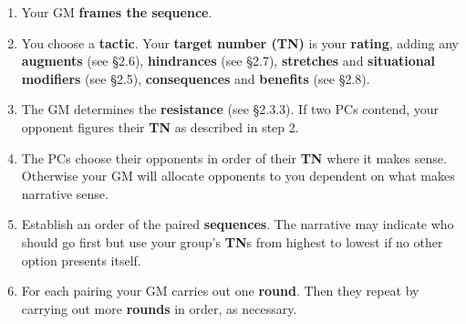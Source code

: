 \documentclass[
  11pt,
]{article}
\providecommand{\tightlist}{%
  \setlength{\itemsep}{0pt}\setlength{\parskip}{0pt}}
\begin{document}
\begin{enumerate}
\def\labelenumi{\arabic{enumi}.}
\tightlist
\item
  Your GM \textbf{frames the sequence}.
\item
  You choose a \textbf{tactic}. Your \textbf{target number (TN)} is your
  \textbf{rating}, adding any \textbf{augments} (see §2.6),
  \textbf{hindrances} (see §2.7), \textbf{stretches} and
  \textbf{situational modifiers} (see §2.5), \textbf{consequences} and
  \textbf{benefits} (see §2.8).
\item
  The GM determines the \textbf{resistance} (see §2.3.3). If two PCs
  contend, your opponent figures their \textbf{TN} as described in step
  2.
\item
  The PCs choose their opponents in order of their \textbf{TN} where it
  makes sense. Otherwise your GM will allocate opponents to you
  dependent on what makes narrative sense.
\item
  Establish an order of the paired \textbf{sequences}. The narrative may
  indicate who should go first but use your group's \textbf{TN}s from
  highest to lowest if no other option presents itself.
\item
  For each pairing your GM carries out one \textbf{round}. Then they
  repeat by carrying out more \textbf{rounds} in order, as necessary.


\end{enumerate}
\end{document}
